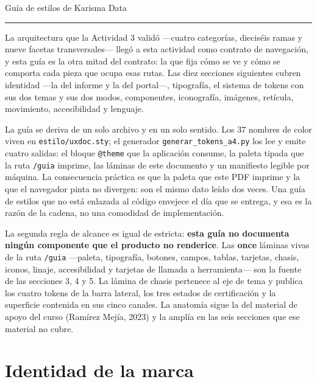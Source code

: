 \begin{uxdestacado}
{\uxhead\fontsize{13.5}{16}\selectfont\color{uxnavy}Guía de estilos de Karisma Data}\par
\vspace{6pt}
{\color{uxamber}\rule{60pt}{2.2pt}}\par
\vspace{8pt}
La arquitectura que la Actividad 3 validó ---cuatro categorías, dieciséis ramas y nueve facetas transversales--- llegó a esta actividad como contrato de navegación, y esta guía es la otra mitad del contrato: la que fija cómo se ve y cómo se comporta cada pieza que ocupa esas rutas. Las diez secciones siguientes cubren identidad ---la del informe y la del portal---, tipografía, el sistema de tokens con sus dos temas y sus dos modos, componentes, iconografía, imágenes, retícula, movimiento, accesibilidad y lenguaje.

\vspace{6pt}
La guía se deriva de un solo archivo y en un solo sentido. Los 37 nombres de color viven en \texttt{estilo/uxdoc.sty}; el generador \texttt{generar\_tokens\_a4.py} los lee y emite cuatro salidas: el bloque \texttt{@theme} que la aplicación consume, la paleta tipada que la ruta \texttt{/guia} imprime, las láminas de este documento y un manifiesto legible por máquina. La consecuencia práctica es que la paleta que este PDF imprime y la que el navegador pinta no divergen: son el mismo dato leído dos veces. Una guía de estilos que no está enlazada al código envejece el día que se entrega, y esa es la razón de la cadena, no una comodidad de implementación.

\vspace{6pt}
La segunda regla de alcance es igual de estricta: \textbf{esta guía no documenta ningún componente que el producto no renderice}. Las \textbf{once} láminas vivas de la ruta \texttt{/guia} ---paleta, tipografía, botones, campos, tablas, tarjetas, chasis, iconos, linaje, accesibilidad y tarjetas de llamada a herramienta--- son la fuente de las secciones 3, 4 y 5. La lámina de chasis pertenece al eje de tema y publica los cuatro tokens de la barra lateral, los tres estados de certificación y la superficie contenida en sus cinco canales. La anatomía sigue la del material de apoyo del curso (Ramírez Mejía, 2023) y la amplía en las seis secciones que ese material no cubre.
\end{uxdestacado}

\section{Identidad de la marca}

